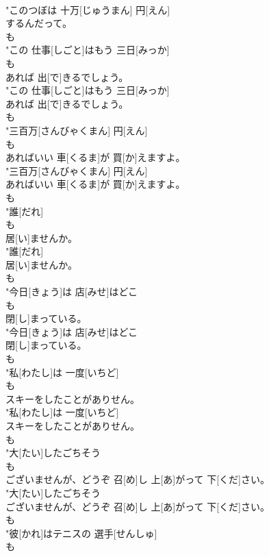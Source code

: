 \documentclass[8pt]{extreport}
\begin{document}
\begin{CJK}{UTF8}{min}
\\	"このつぼは 十万[じゅうまん] 円[えん]
\\	するんだって。
\\	も
\\	"この 仕事[しごと]はもう 三日[みっか]
\\	も
\\	あれば 出[で]きるでしょう。
\\	"この 仕事[しごと]はもう 三日[みっか]
\\	あれば 出[で]きるでしょう。
\\	も
\\	"三百万[さんびゃくまん] 円[えん]
\\	も
\\	あればいい 車[くるま]が 買[か]えますよ。
\\	"三百万[さんびゃくまん] 円[えん]
\\	あればいい 車[くるま]が 買[か]えますよ。
\\	も
\\	"誰[だれ]
\\	も
\\	居[い]ませんか。
\\	"誰[だれ]
\\	居[い]ませんか。
\\	も
\\	"今日[きょう]は 店[みせ]はどこ
\\	も
\\	閉[し]まっている。
\\	"今日[きょう]は 店[みせ]はどこ
\\	閉[し]まっている。
\\	も
\\	"私[わたし]は 一度[いちど]
\\	も
\\	スキーをしたことがありせん。
\\	"私[わたし]は 一度[いちど]
\\	スキーをしたことがありせん。
\\	も
\\	"大[たい]したごちそう
\\	も
\\	ございませんが、どうぞ 召[め]し 上[あ]がって 下[くだ]さい。
\\	"大[たい]したごちそう
\\	ございませんが、どうぞ 召[め]し 上[あ]がって 下[くだ]さい。
\\	も
\\	"彼[かれ]はテニスの 選手[せんしゅ]
\\	も

\end{CJK}
\end{document}
